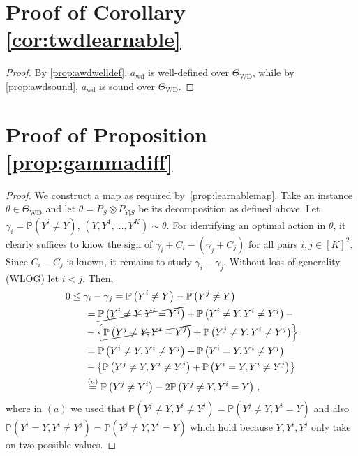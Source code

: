 \documentclass[11pt]{article} %
\newcommand{\todoc}[2][]{\todo[color=Apricot!20,size=\tiny,#1]{Cs: #2}}
\newcommand{\todom}[2][]{\todo[color=Cerulean!20,size=\tiny,#1]{M: #2}}
\newcommand{\WD}{\mathrm{WD}}
\newcommand{\TWD}{\Theta_{\WD}}
\newcommand{\awd}{a_{\mathrm{wd}}}
\newcommand{\Prob}[1]{\mathbb{P}\left(#1\right)}
\begin{document}
\section*{Proof of Corollary \ref{cor:twdlearnable}}
\begin{proof}
	By \cref{prop:awdwelldef}, $\awd$ is well-defined over $\TWD$, while by \cref{prop:awdsound}, $\awd$ is sound over $\TWD$.
\end{proof}

\section*{Proof of Proposition \ref{prop:gammadiff}}

\begin{proof}
	
	We construct a map as required by~\cref{prop:learnablemap}.
	Take an instance $\theta \in \TWD$ and let $\theta = P_S \otimes P_{Y|S}$ be its decomposition
	as defined above.
	Let $\gamma_i = \Prob{Y^i \ne Y}$, $(Y,Y^1,\dots,Y^K)\sim \theta$.
	For identifying an optimal action in $\theta$, it clearly suffices
	to know the sign of $\gamma_i + C_i - (\gamma_j +C_j)$ for all pairs $i,j\in [K]^2$.
	Since $C_i - C_j$ is known, it remains to study $\gamma_i-\gamma_j$.
	Without loss of generality (WLOG) let $i<j$.
	Then, 
	\begin{align*}
	\MoveEqLeft 0  \le \gamma_i  - \gamma_j = \Prob{Y^i\ne Y} - \Prob{Y^j\ne Y} \\
	& = \cancel{\Prob{Y^i\ne Y, Y^i=Y^j}} + \Prob{ Y^i\ne Y, Y^i\ne Y^j } - \\
	& - \left\{ 
	\cancel{\Prob{Y^j\ne Y, Y^i=Y^j}} + \Prob{ Y^j\ne Y, Y^i\ne Y^j }\right\}\\
	& = \Prob{ Y^i\ne Y, Y^i \ne Y^j } + \Prob{Y^i=Y,Y^i\ne Y^j}       \\
	& - \left\{ 
	\Prob{ Y^j \ne Y, Y^i\ne Y^j } + \Prob{ Y^i=Y,Y^i\ne Y^j}
	\right\}\\
	& \stackrel{\footnotesize (a)}{=} \Prob{ Y^j \ne Y^i } -2 \Prob{ Y^j\ne Y, Y^i = Y }\,,
	\end{align*}
	where in $(a)$ we used that $\Prob{ Y^j \ne Y, Y^i\ne Y^j } =  \Prob{ Y^j\ne Y,Y^i= Y}$ and also
	$\Prob{ Y^i=Y,Y^i\ne Y^j} = \Prob{ Y^j\ne Y,Y^i= Y}$
	which hold because $Y,Y^i,Y^j$ only take on two possible values.
\end{proof}
\end{document}
